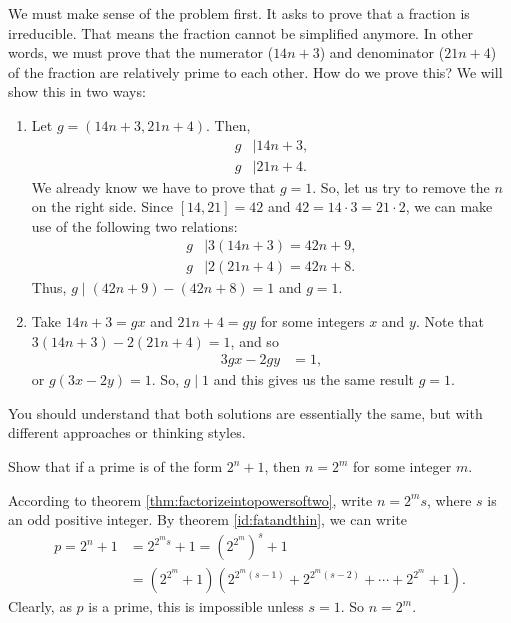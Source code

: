 \documentclass{subfile}
\begin{document}
	\begin{solution}
		We must make sense of the problem first. It asks to prove that a fraction is irreducible. That means the fraction cannot be simplified anymore. In other words, we must prove that the numerator ($14n+3$) and denominator ($21n+4$) of the fraction are relatively prime to each other. How do we prove this? We will show this in two ways:
		\begin{enumerate}
			\item Let $g=(14n+3,21n+4)$. Then,
			\begin{align*}
				g & \mid 14n+3,\\
				g & \mid 21n+4.
			\end{align*}
		We already know we have to prove that $g=1$. So, let us try to remove the $n$ on the right side. Since $[14,21]=42$ and $42=14\cdot3=21\cdot2$, we can make use of the following two relations:
			\begin{align*}
				g & \mid 3(14n+3) = 42n+9,\\
				g & \mid  2(21n+4)= 42n+8.
			\end{align*}
		Thus, $g\mid (42n+9)-(42n+8)=1$ and $g=1$.

			\item Take $14n+3=gx$ and $21n+4=gy$ for some integers $x$ and $y$. Note that $3(14n+3)-2(21n+4) = 1$, and so
			\begin{align*}
				 3gx-2gy  & = 1,
			\end{align*}
		or $g(3x-2y) = 1.$ So, $g\mid 1$ and this gives us the same result $g=1$.
		\end{enumerate}
	\end{solution}

	\begin{remark}
		You should understand that both solutions are essentially the same, but with different approaches or thinking styles.
	\end{remark}

	\begin{problem}\label{prob:prime=poweroftwoplusone}
		Show that if a prime is of the form $2^n+1$, then $n=2^m$ for some integer $m$.
	\end{problem}

	\begin{solution}
		According to theorem \autoref{thm:factorizeintopowersoftwo}, write $n=2^ms$, where $s$ is an odd positive integer. By theorem \eqref{id:fatandthin}, we can write
			\begin{align*}
				p = 2^n+1 &= 2^{2^{m}s}+1 = \left(2^{2^{m}}\right)^s+1\\
				   		  &=\left(2^{2^m}+1\right)\left(2^{2^{m}(s-1)}+2^{2^{m}(s-2)}+ \cdots + 2^{2^{m}}+1\right).
			\end{align*}
		Clearly, as $p$ is a prime, this is impossible unless $s=1$. So $n=2^m$.
	\end{solution}
\end{document}
